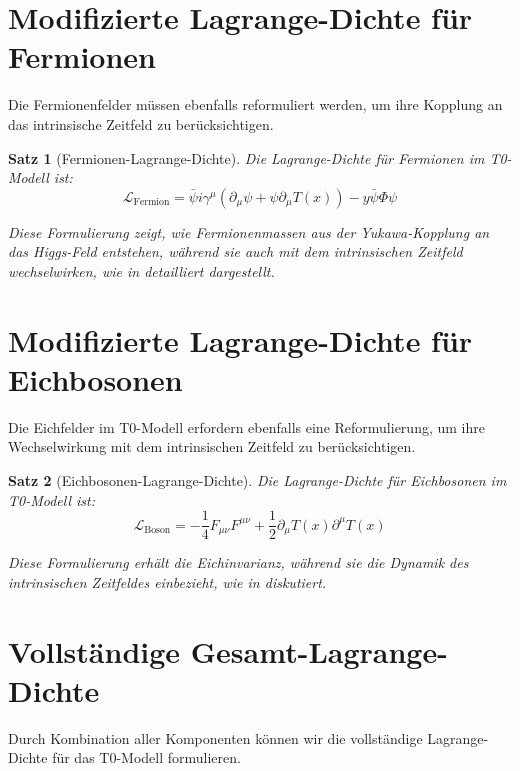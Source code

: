 \documentclass[12pt,a4paper]{article}
\newcommand{\Tfield}{T(x)}
\newtheorem{theorem}{Satz}[section]
\theoremstyle{definition}
\theoremstyle{remark}
\begin{document}
	\section{Modifizierte Lagrange-Dichte für Fermionen}
	Die Fermionenfelder müssen ebenfalls reformuliert werden, um ihre Kopplung an das intrinsische Zeitfeld zu berücksichtigen.
	
	\begin{theorem}[Fermionen-Lagrange-Dichte]
		Die Lagrange-Dichte für Fermionen im T0-Modell ist:
		\begin{equation}
			\mathcal{L}_{\text{Fermion}} = \bar{\psi} i \gamma^\mu (\partial_\mu \psi + \psi \partial_\mu \Tfield) - y \bar{\psi} \Phi \psi
		\end{equation}
		
		Diese Formulierung zeigt, wie Fermionenmassen aus der Yukawa-Kopplung an das Higgs-Feld entstehen, während sie auch mit dem intrinsischen Zeitfeld wechselwirken, wie in \cite{pascher_higgs_2025} detailliert dargestellt.
	\end{theorem}
	
	\section{Modifizierte Lagrange-Dichte für Eichbosonen}
	Die Eichfelder im T0-Modell erfordern ebenfalls eine Reformulierung, um ihre Wechselwirkung mit dem intrinsischen Zeitfeld zu berücksichtigen.
	
	\begin{theorem}[Eichbosonen-Lagrange-Dichte]
		Die Lagrange-Dichte für Eichbosonen im T0-Modell ist:
		\begin{equation}
			\mathcal{L}_{\text{Boson}} = -\frac{1}{4} F_{\mu\nu} F^{\mu\nu} + \frac{1}{2} \partial_\mu \Tfield \partial^\mu \Tfield
		\end{equation}
		
		Diese Formulierung erhält die Eichinvarianz, während sie die Dynamik des intrinsischen Zeitfeldes einbezieht, wie in \cite{pascher_feldtheorie_2025} diskutiert.
	\end{theorem}

\section{Vollständige Gesamt-Lagrange-Dichte}
Durch Kombination aller Komponenten können wir die vollständige Lagrange-Dichte für das T0-Modell formulieren.
\end{document}
